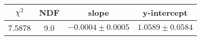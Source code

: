 \begin{tabular}{|c|c|c|c|}

\hline
$\chi^{2}$ & NDF & slope & y-intercept  \\
\hline
7.5878 & 9.0 & $-0.0004\pm0.0005$ & $1.0589\pm0.0584$ \\
\hline

\end{tabular}